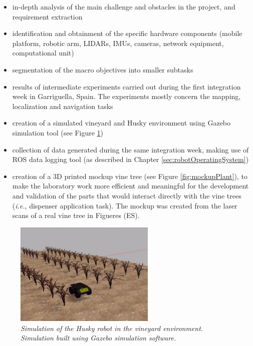 \begin{itemize}
	\item in-depth analysis of the main challenge and obstacles in the project, and requirement extraction
	\item identification and obtainment of the specific hardware components (mobile platform, robotic arm, \ac{LIDAR}s, \ac{IMU}s, cameras, network equipment, computational unit)
	\item segmentation of the macro objectives into smaller subtasks
	\item results of intermediate experiments carried out during the first integration week in Garriguella, Spain. The experiments mostly concern the mapping, localization and navigation tasks
	\item creation of a simulated vineyard and Husky environment using Gazebo simulation tool (see Figure \ref{fig:simulazioneGazebo})
	\item collection of data generated during the same integration week, making use of \ac{ROS} data logging tool (as described in Chapter \ref{sec:robotOperatingSystem})
	\item creation of a 3D printed mockup vine tree (see Figure \ref{fig:mockupPlant}), to make the laboratory work more efficient and meaningful for the development and validation of the parts that would interact directly with the vine trees (\textit{i.e.}, dispenser application task). The mockup was created from the laser scans of a real vine tree in Figueres (ES).
\end{itemize}

\begin{figure}
	\centering
	\includegraphics[width=0.6\textwidth]{Images/grape_project/simulatedVine.png}
	\caption{\textit{Simulation of the Husky robot in the vineyard environment. Simulation built using Gazebo simulation software.}}
	\label{fig:simulazioneGazebo}
\end{figure}

